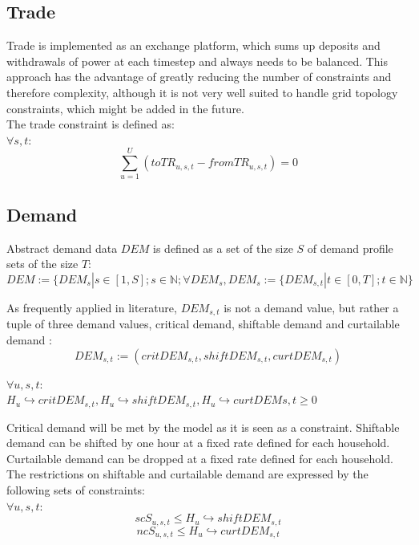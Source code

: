 \documentclass[
	11pt,								%
	DIV10,								%
	a4paper,         					%
	oneside,							%
	headheight=20pt,					%
	footheight=20pt,					%
    parskip=full,						%
    listof=totoc,						%
	bibliography=totoc,					%
	index=totoc,						%
]{scrartcl}
\begin{document}
\subsection{Trade}
Trade is implemented as an exchange platform, which sums up deposits and withdrawals of power at each timestep and always needs to be balanced. This approach has the advantage of greatly reducing the number of constraints and therefore complexity, although it is not very well suited to handle grid topology constraints, which might be added in the future.\\
The trade constraint is defined as:
\\

$\forall s,t$:
\begin{equation}
	\sum_{u = 1}^{U}(toTR_{u,s,t}-fromTR_{u,s,t}) = 0
\end{equation}





\subsection{Demand}
Abstract demand data $DEM$ is defined as a set of the size $S$ of demand profile sets of the size $T$:
\begin{equation}
 DEM:= \{DEM_s | s \in [1,S]; s\in \mathbb{N}; \forall DEM_s, DEM_s := \{DEM_{s,t} | t\in [0,T]; t \in \mathbb{N}\}
\end{equation}

As frequently applied in literature, $DEM_{s,t}$ is not a demand value, but rather a tuple of three demand values, critical demand, shiftable demand and curtailable demand \cite{silvente2015rolling}\cite{zhang2015optimal}\cite{8216436}\cite{7972908} : \\
\begin{equation}
 DEM_{s,t}:= (critDEM_{s,t}, shiftDEM_{s,t}, curtDEM_{s,t}) 
\end{equation}

$\forall u,s,t$:\\
$H_u \hookrightarrow critDEM_{s,t}, H_u \hookrightarrow shiftDEM_{s,t}, H_u \hookrightarrow curtDEM{s,t} \geq 0$

Critical demand will be met by the model as it is seen as a constraint. Shiftable demand can be shifted by one hour at a fixed rate defined for each household. Curtailable demand can be dropped at a fixed rate defined for each household.
The restrictions on shiftable and curtailable demand are expressed by the following sets of constraints:
\\
$\forall u,s,t$:
\begin{equation}
	scS_{u,s,t} \leq H_u \hookrightarrow shiftDEM_{s,t}
\end{equation}
\begin{equation}
	ncS_{u,s,t} \leq H_u \hookrightarrow curtDEM_{s,t}
\end{equation}
\end{document}

